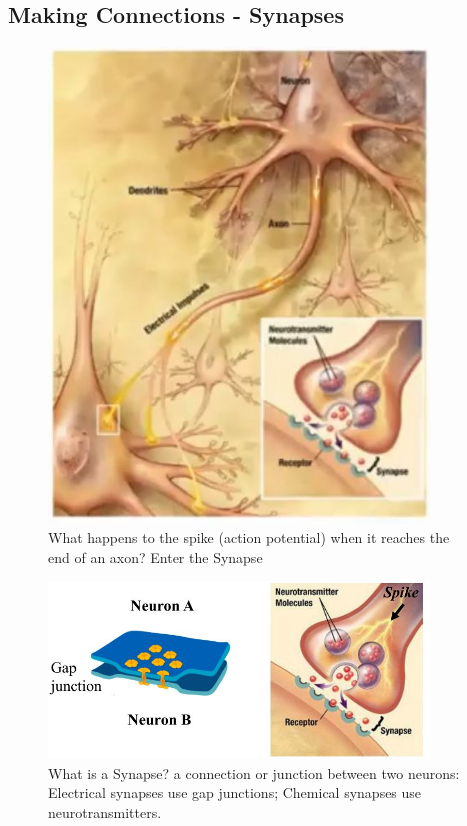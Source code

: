 \documentclass[]{article}
\begin{document}
\subsection{Making Connections - Synapses}
\begin{figure}[H]
	\caption[Enter the Synapse]{What happens to the spike (action potential) when	it reaches the 	end of an axon?	Enter the Synapse}\label{fig:enter:the:synapse}
	\includegraphics[width=0.9\textwidth]{enter-synapse}
\end{figure}

\begin{figure}[H]
	\caption[What is a Synapse?]{What is a Synapse?  a connection or junction between two neurons: Electrical synapses use gap junctions;	Chemical synapses use neurotransmitters.}
	\includegraphics[width=0.9\textwidth]{synapse1}
\end{figure}
\end{document}

